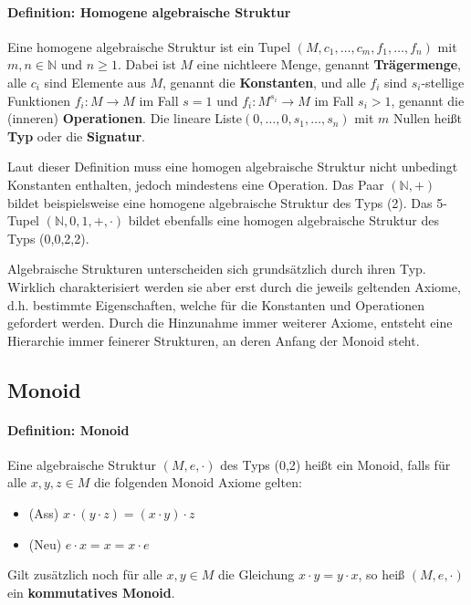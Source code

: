 \paragraph{Definition: Homogene algebraische Struktur}
Eine homogene algebraische Struktur ist ein Tupel $(M,c_1,\dots,c_m,f_1,\dots,f_n)$ mit $m,n \in \mathbb{N}$ und $n \geq 1$. Dabei ist $M$ eine nichtleere Menge, genannt \textbf{Trägermenge}, alle $c_i$ sind Elemente aus $M$, genannt die \textbf{Konstanten}, und alle $f_i$ sind $s_i$-stellige Funktionen $f_i:M \rightarrow M$ im Fall $s = 1$ und $f_i:M^{s_i} \rightarrow M$ im Fall $s_i>1$, genannt die (inneren) \textbf{Operationen}. Die lineare Liste$(0,\dots,0,s_1,\dots,s_n)$ mit $m$ Nullen heißt \textbf{Typ} oder die \textbf{Signatur}.\newline

Laut dieser Definition muss eine homogen algebraische Struktur nicht unbedingt Konstanten enthalten, jedoch mindestens eine Operation. Das Paar $(\mathbb{N},+)$ bildet beispielsweise eine homogene algebraische Struktur des Typs (2). Das 5-Tupel $(\mathbb{N},0,1,+,\cdot)$ bildet ebenfalls eine homogen algebraische Struktur des Typs (0,0,2,2).

Algebraische Strukturen unterscheiden sich grundsätzlich durch ihren Typ. Wirklich charakterisiert werden sie aber erst durch die jeweils geltenden Axiome, d.h. bestimmte Eigenschaften, welche für die Konstanten und Operationen gefordert werden. Durch die Hinzunahme immer weiterer Axiome, entsteht eine Hierarchie immer feinerer Strukturen, an deren Anfang der Monoid steht.

\subsection{Monoid}

\paragraph{Definition: Monoid}
Eine algebraische Struktur $(M,e,\cdot)$ des Typs (0,2) heißt ein Monoid, falls für alle $x,y,z\in M$ die folgenden Monoid Axiome gelten:
\begin{itemize}
    \item (Ass) $x \cdot (y \cdot z) = (x \cdot y) \cdot z$
    \item (Neu) $e \cdot x = x = x \cdot e$
\end{itemize}  Gilt zusätzlich noch für alle $x,y \in M$ die Gleichung $x \cdot y = y \cdot x$, so heiß $(M,e,\cdot)$ ein \textbf{kommutatives Monoid}.\\

